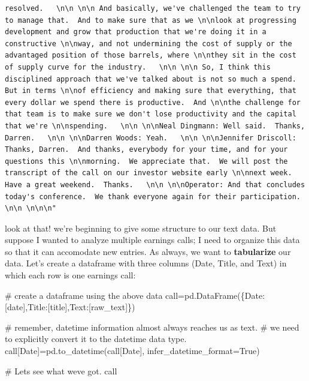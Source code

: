 \documentclass[
  letterpaper,
  DIV=11,
  numbers=noendperiod]{scrreprt}
\newenvironment{Shaded}{\begin{snugshade}}{\end{snugshade}}
\newcommand{\CommentTok}[1]{\textcolor[rgb]{0.37,0.37,0.37}{#1}}
\newcommand{\NormalTok}[1]{\textcolor[rgb]{0.00,0.23,0.31}{#1}}
\newcommand{\OperatorTok}[1]{\textcolor[rgb]{0.37,0.37,0.37}{#1}}
\newcommand{\StringTok}[1]{\textcolor[rgb]{0.13,0.47,0.30}{#1}}
\newcommand{\VariableTok}[1]{\textcolor[rgb]{0.07,0.07,0.07}{#1}}
\begin{document}
\begin{verbatim}
resolved.   \n\n \n\n And basically, we've challenged the team to try to manage that.  And to make sure that as we \n\nlook at progressing development and grow that production that we're doing it in a constructive \n\nway, and not undermining the cost of supply or the advantaged position of those barrels, where \n\nthey sit in the cost of supply curve for the industry.   \n\n \n\n So, I think this disciplined approach that we've talked about is not so much a spend.  But in terms \n\nof efficiency and making sure that everything, that every dollar we spend there is productive.  And \n\nthe challenge for that team is to make sure we don't lose productivity and the capital that we're \n\nspending.   \n\n \n\nNeal Dingmann: Well said.  Thanks, Darren.   \n\n \n\nDarren Woods: Yeah.   \n\n \n\nJennifer Driscoll: Thanks, Darren.  And thanks, everybody for your time, and for your questions this \n\nmorning.  We appreciate that.  We will post the transcript of the call on our investor website early \n\nnext week.  Have a great weekend.  Thanks.   \n\n \n\nOperator: And that concludes today's conference.  We thank everyone again for their participation.   \n\n \n\n\n"
\end{verbatim}

look at that! we're beginning to give some structure to our text data.
But suppose I wanted to analyze multiple earnings calls; I need to
organize this data so that it can accomodate new entries. As always, we
want to \textbf{tabularize} our data. Let's create a dataframe with
three columns (Date, Title, and Text) in which each row is one earnings
call:

\begin{Shaded}
\begin{Highlighting}[]
\CommentTok{\# create a dataframe using the above data }
\NormalTok{call}\OperatorTok{=}\NormalTok{pd.DataFrame(\{}\StringTok{\textquotesingle{}Date\textquotesingle{}}\NormalTok{:[date],}\StringTok{\textquotesingle{}Title\textquotesingle{}}\NormalTok{:[title],}\StringTok{\textquotesingle{}Text\textquotesingle{}}\NormalTok{:[raw\_text]\})}

\CommentTok{\# remember, datetime information almost always reaches us as text. }
\CommentTok{\# we need to explicitly convert it to the datetime data type. }
\NormalTok{call[}\StringTok{\textquotesingle{}Date\textquotesingle{}}\NormalTok{]}\OperatorTok{=}\NormalTok{pd.to\_datetime(call[}\StringTok{\textquotesingle{}Date\textquotesingle{}}\NormalTok{], infer\_datetime\_format}\OperatorTok{=}\VariableTok{True}\NormalTok{)}

\CommentTok{\# Let\textquotesingle{}s see what we\textquotesingle{}ve got.}
\NormalTok{call}
\end{Highlighting}
\end{Shaded}
\end{document}
